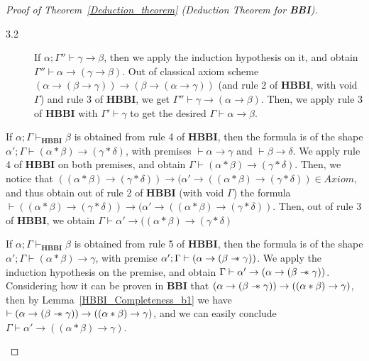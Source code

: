 \documentclass[a4paper]{article}
\newcommand\magicwand{\mathrel{-\mkern-6mu*}}
\newcommand{\BBI}{\textbf{BBI}\xspace}
\begin{document}
\begin{proof}[Proof of Theorem~\ref{Deduction_theorem} (Deduction Theorem for \BBI)]
\begin{description}
\begin{description}
    \item[3.2] If $\alpha;\Gamma'' \vdash \gamma \rightarrow \beta$, then we apply the induction hypothesis on it, and obtain $\Gamma'' \vdash \alpha \rightarrow (\gamma \rightarrow \beta)$. Out of classical axiom scheme $(\alpha \rightarrow (\beta \rightarrow \gamma)) \rightarrow (\beta \rightarrow (\alpha \rightarrow \gamma))$ (and rule 2 of \textbf{HBBI}, with void $\Gamma$) and rule 3 of \textbf{HBBI}, we get $\Gamma''\vdash \gamma \rightarrow (\alpha \rightarrow \beta)$. Then, we apply rule 3 of \textbf{HBBI} with $\Gamma' \vdash \gamma$ to get the desired $\Gamma \vdash \alpha \rightarrow \beta$.
    
\end{description}
        
\item[4.] If $\alpha; \Gamma \vdash_{\textbf{HBBI}} \beta$ is obtained from rule 4 of \textbf{HBBI}, then the formula is of the shape $\alpha'; \Gamma \vdash (\alpha * \beta)\rightarrow(\gamma * \delta)$, with premises $\vdash \alpha \rightarrow \gamma$ and $\vdash \beta \rightarrow \delta$. We apply rule 4 of \textbf{HBBI} on both premises, and obtain $\Gamma \vdash (\alpha * \beta)\rightarrow(\gamma * \delta)$. Then, we notice that $((\alpha * \beta)\rightarrow(\gamma * \delta)) \rightarrow (\alpha' \rightarrow ((\alpha * \beta)\rightarrow(\gamma * \delta)) \in Axiom$, and thus obtain out of rule 2 of \textbf{HBBI} (with void $\Gamma$) the formula $\vdash ((\alpha * \beta)\rightarrow(\gamma * \delta)) \rightarrow (\alpha' \rightarrow ((\alpha * \beta)\rightarrow(\gamma * \delta))$. Then, out of rule 3 of \textbf{HBBI}, we obtain $\Gamma\vdash\alpha' \rightarrow ((\alpha * \beta)\rightarrow(\gamma * \delta)$

\item[5.] If $\alpha; \Gamma \vdash_{\textbf{HBBI}} \beta$ is obtained from rule 5 of \textbf{HBBI}, then the formula is of the shape $\alpha'; \Gamma \vdash (\alpha * \beta) \rightarrow \gamma$, with premise $\alpha'; \Gamma \vdash (\alpha \rightarrow (\beta \magicwand \gamma))$. We apply the induction hypothesis on the premise, and obtain $\Gamma \vdash \alpha' \rightarrow(\alpha \rightarrow (\beta \magicwand \gamma))$. Considering how it can be proven in \BBI that $(\alpha \rightarrow (\beta \magicwand \gamma))\rightarrow ((\alpha * \beta)\rightarrow \gamma)$, then by Lemma~\ref{HBBI_Completeness_b1} we have $\vdash (\alpha \rightarrow (\beta \magicwand \gamma))\rightarrow ((\alpha * \beta)\rightarrow \gamma)$, and we can easily conclude $\Gamma \vdash \alpha' \rightarrow ((\alpha * \beta) \rightarrow \gamma)$.


\end{description}
\end{proof}
\end{document}

